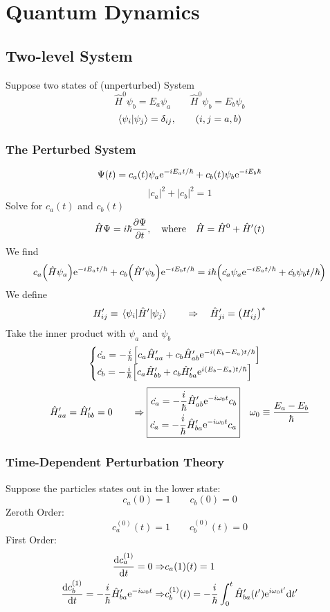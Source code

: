 \chapter{Quantum Dynamics}
\section{Two-level System}
Suppose two states of (unperturbed) System
\[\hat{H}^0\psi_b=E_a\psi_a\qquad\hat{H}^0\psi_b=E_b\psi_b\]
\[\braket{\psi_i}{\psi_j}=\delta_{ij},\qquad(i,j=a,b)\]
\subsection{The Perturbed System}
\[\Psi(t)=c_a(t)\psi_a{\rm e}^{-iE_at/\hbar}+c_b(t)\psi_b{\rm e}^{-iE_b\hbar}\]
\[|c_a|^2+|c_b|^2=1\]
Solve for \(c_a(t)\) and \(c_b(t)\)
\[\hat{H}\Psi=i\hbar\pdv{\Psi}{t},\quad\text{where}\quad\hat{H}=\hat{H}^0+\hat{H}'(t)\]
We find 
\[c_a\qty(\hat{H}\psi_a){\rm e}^{-iE_at/\hbar}+c_b\qty(\hat{H}'\psi_b){\rm e}^{-iE_bt/\hbar}
  = i\hbar\qty(\dot{c_a}\psi_a{\rm e}^{-iE_at/\hbar}+\dot{c_b}\psi_bt/\hbar)\]
We define
\[H_{ij}'\equiv\matrixel{\psi_i}{\hat{H}'}{\psi_j}\qquad\Rightarrow\quad \hat{H}_{ji}'=\qty(H_{ij}')^*\]
Take the inner product with \(\psi_a\) and \(\psi_b\)
\[\begin{cases}
    \dot{c_a}=-\frac{i}{\hbar}\qty[c_a\hat{H}_{aa}'+c_b\hat{H}_{ab}'{\rm e}^{-i(E_b-E_a)t/\hbar}] \\
    \dot{c_b}=-\frac{i}{\hbar}\qty[c_a\hat{H}_{bb}'+c_b\hat{H}_{ba}'{\rm e}^{i(E_b-E_a)t/\hbar}] \\
\end{cases}\]
\[\hat{H}'_{aa}=\hat{H}_{bb}'=0\qquad\Rightarrow\boxed{
    \begin{aligned}
        \dot{c_a}=-\frac{i}{\hbar} \hat{H}_{ab}'  {\rm e}^{-i\omega_0t} c_b \\
        \dot{c_a}=-\frac{i}{\hbar} \hat{H}_{ba}'  {\rm e}^{-i\omega_0t} c_a \\
    \end{aligned}
}\quad\omega_0\equiv\frac{E_a-E_b}{\hbar}\]
\subsection{Time-Dependent Perturbation Theory}
Suppose the particles states out in the lower state:
\[c_a(0)=1\qquad c_b(0)=0\]
Zeroth Order:
\[c_a^{(0)}(t)=1\qquad c_b^{(0)}(t)=0\]
First Order:
\[\begin{aligned}
    \dv{c_a^{(1)}}{t}=0\Rightarrow& c_a{(1)}(t)=1 \\
    \dv{c_b^{(1)}}{t}=-\frac{i}{\hbar}\hat{H}_{ba}'  {\rm e}^{-i\omega_0t} \Rightarrow&
        c_b^{(1)}(t)=-\frac{i}{\hbar}\int_0^t\hat{H}'_{ba}(t'){\rm e}^{i\omega_0t'}\dd t'
\end{aligned}\]

